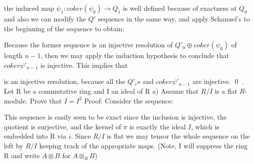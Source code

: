 \documentclass{article}
\begin{document}
the induced map $\psi_1:coker (\psi_0) \rightarrow  Q_1$ is well defined because of exactness at $Q_0$
and also we can modify the $Q'$ sequence in the same way, and apply Schanuel's to the beginning of the sequence to obtain:
\newline
{}
\newline
Because the former sequence is an injective resolution of $Q'_0\oplus coker (\psi_0)$ of length $n-1$, then we may apply the induction hypothesis to conclude that ${coker\psi'_{n-1}}$ is injective.
This implies that
\newline
{}
\newline
is an injective resolution, because all the $Q'_is$ and $coker\psi'_{n-1}$ are injective. \qed
{}. Let R be a commutative ring and I an ideal of R
\newline
a) Assume that $R/I$ is a flat $R$-module.  Prove that $I = I^2$
\newline
Proof:
Consider the sequence:
\newline 
This sequence is easily seen to be exact since the inclusion is injective, the quotient is surjective, and the kernel of $\pi$ is exactly the ideal $I$, which is embedded into R via $i$.
Since $R/I$ is flat we may tensor the whole sequence on the left by $R/I$ keeping track of the appropriate maps. (Note, I will suppress the ring R and write $A \otimes B$ for $A \otimes_R B$)
\newline
{}
\end{document}
